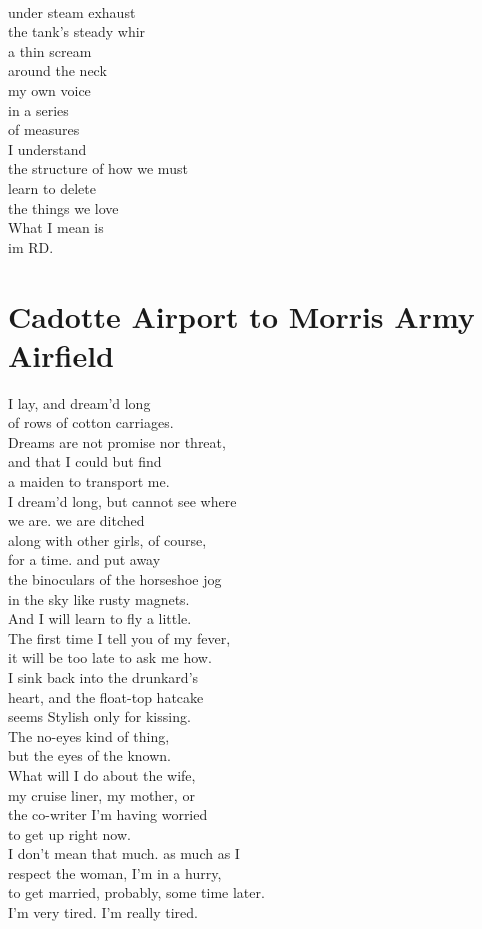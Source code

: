 \documentclass[smalldemyvopaper,11pt,twoside,onecolumn,openright,extrafontsizes]{memoir}
\begin{document}
\\under steam exhaust
\\the tank's steady whir
\\a thin scream
\\around the neck
\\my own voice
\\in a series
\\of measures
\\I understand
\\the structure of how we must
\\learn to delete
\\the things we love
\\What I mean is
\\im RD.



\chapter{Cadotte Airport to Morris Army Airfield}
I lay, and dream'd long
\\of rows of cotton carriages.
\\Dreams are not promise nor threat,
\\and that I could but find
\\a maiden to transport me.
\\I dream'd long, but cannot see where
\\we are.                   we are ditched
\\along with other girls, of course,
\\for a time.                       and put away
\\the binoculars of the horseshoe jog
\\in the sky like rusty magnets.
\\And I will learn to fly a little.
\\The first time I tell you of my fever,
\\it will be too late to ask me how.
\\I sink back into the drunkard's
\\heart, and the float-top hatcake
\\seems Stylish only for kissing.
\\The no-eyes kind of thing,
\\but the eyes of the known.
\\What will I do about the wife,
\\my cruise liner, my mother, or
\\the co-writer I'm having worried
\\to get up right now.
\\I don't mean that much.                    as much as I
\\respect the woman, I'm in a hurry,
\\to get married, probably, some time later.
\\I'm very tired.                    I'm really tired.
\end{document}
